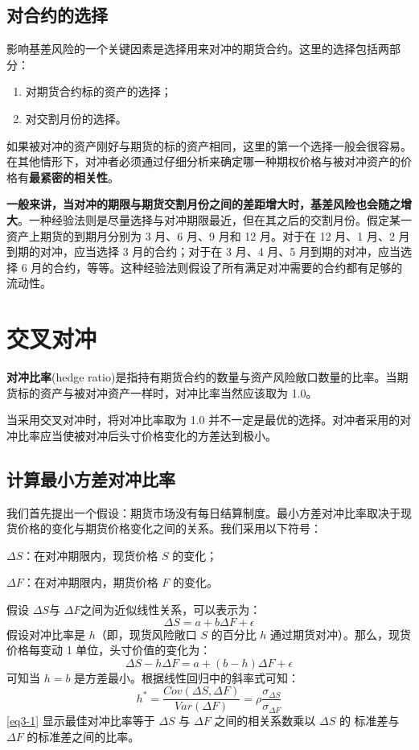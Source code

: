 \subsection{对合约的选择}
影响基差风险的一个关键因素是选择用来对冲的期货合约。这里的选择包括两部分：
\begin{enumerate}
    \item 对期货合约标的资产的选择；
    \item 对交割月份的选择。
\end{enumerate}
如果被对冲的资产刚好与期货的标的资产相同，这里的第一个选择一般会很容易。在其他情形下，对冲者必须通过仔细分析来确定哪一种期权价格与被对冲资产的价格有\textbf{最紧密的相关性}。

\textbf{一般来讲，当对冲的期限与期货交割月份之间的差距增大时，基差风险也会随之增大}。一种经验法则是尽量选择与对冲期限最近，但在其之后的交割月份。假定某一资产上期货的到期月分别为 3 月、6 月、9 月和 12 月。对于在 12 月、1 月、2 月到期的对冲，应当选择 3 月的合约；对于在 3 月、4 月、5 月到期的对冲，应当选择 6 月的合约，等等。这种经验法则假设了所有满足对冲需要的合约都有足够的流动性。
\section{交叉对冲}
\textbf{对冲比率}(hedge ratio)是指持有期货合约的数量与资产风险敞口数量的比率。当期货标的资产与被对冲资产一样时，对冲比率当然应该取为 1.0。

当采用交叉对冲时，将对冲比率取为 1.0 并不一定是最优的选择。对冲者采用的对冲比率应当使被对冲后头寸价格变化的方差达到极小。
\subsection{计算最小方差对冲比率}
我们首先提出一个假设：期货市场没有每日结算制度。最小方差对冲比率取决于现货价格的变化与期货价格变化之间的关系。我们采用以下符号：

$\Delta S$：在对冲期限内，现货价格 $S$ 的变化；

$\Delta F$：在对冲期限内，期货价格 $F$ 的变化。

假设 $\Delta S$与 $\Delta F$之间为近似线性关系，可以表示为：
$$\Delta S=a+b\Delta F+\epsilon$$
假设对冲比率是 $h$（即，现货风险敞口 $S$ 的百分比 $h$ 通过期货对冲）。那么，现货价格每变动 1 单位，头寸价值的变化为：
$$\Delta S-h\Delta F=a+(b-h)\Delta F+\epsilon$$
可知当 $h=b$ 是方差最小。根据线性回归中的斜率式可知：
\begin{equation}\label{eq3-1}
    h^*=\frac{Cov(\Delta S, \Delta F)}{Var(\Delta F)}=\rho\frac{\sigma_{\Delta S}}{\sigma_{\Delta F}}
\end{equation}
\autoref{eq3-1} 显示最佳对冲比率等于 $\Delta S$ 与 $\Delta F $ 之间的相关系数乘以 $\Delta S$ 的
标准差与 $\Delta F $ 的标准差之间的比率。


